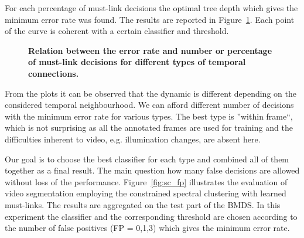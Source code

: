 For each percentage of must-link decisions the optimal tree depth which gives the minimum error rate was found. The results are reported in Figure~\ref{fig:plots_fpr}.
Each point of the curve is coherent with a certain classifier and threshold.
\begin{figure}[htbp]
\centering
{}
\quad
{}
 \caption[Relation between the error rate and number or percentage of must-link decisions for different types of temporal connections]{
  {\bf Relation between the error rate and number or percentage of must-link decisions for different types of temporal connections.}}
\label{fig:plots_fpr}
\end{figure}
\newpage
From the plots it can be observed that the dynamic is different depending on the considered temporal neighbourhood. We can afford different number of decisions with the minimum error rate for various types.
The best type is ''within frame``, which is not surprising as all the annotated frames are used for training and the difficulties inherent to video, e.g. illumination changes, are absent here.

Our goal is to choose the best classifier for each type and combined all of them together as a final result. The main question how many false decisions are allowed without loss of the performance.  
Figure~\ref{fig:sc_fp} illustrates the evaluation of video segmentation employing the constrained spectral clustering with learned must-links. The results are aggregated on the test part of the BMDS. 
In this experiment the classifier and the corresponding threshold are chosen 
according to the number of false positives (FP = 0,1,3) which gives the minimum error rate.

